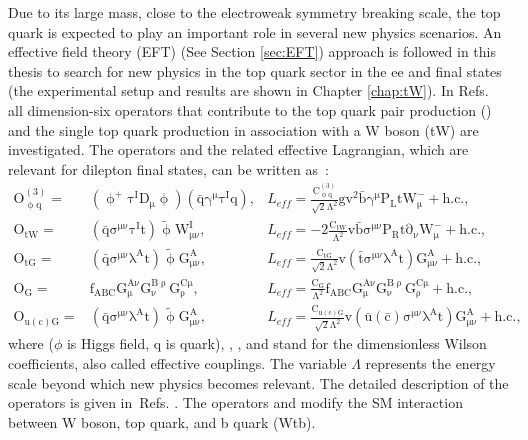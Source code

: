 Due to its large mass, close to the electroweak symmetry breaking scale, the top quark is expected to play an important role in several new physics scenarios.
An effective field theory (EFT) (See Section \ref{sec:EFT}) approach is followed in this thesis to search for new physics in the top quark sector in the ee and \mumu final states (the experimental setup and results are shown in Chapter \ref{chap:tW}).
In Refs.~\cite{Zhang:2010dr,Durieux:2014xla} all dimension-six operators that contribute to the top quark pair production (\ttbar) and the single top quark production in association with a W boson (tW) are investigated. The operators and the related effective Lagrangian, which are relevant for dilepton final states, can be written as~\cite{Grzadkowski:2010es}:
\begin{eqnarray}
\label{eq1}
\mathrm{O_{\upphi q}^{(3)}} =& \mathrm{(\upphi^+\tau^ID_\mu\upphi)(\bar{q}\gamma^\mu\tau^Iq)}  ,& L_\mathit{eff}=\mathrm{\frac{C_{\upphi q}^{(3)}}{{\sqrt 2}\Lambda^2} gv^2\bar{b}\gamma^\mu P_LtW^-_\mu+h.c.,}\\
\mathrm{O_{tW}} =& \mathrm{(\bar{q}\sigma^{\mu\nu}\tau^It)\tilde{\upphi}W^I_{\mu\nu}} ,& L_\mathit{eff}=\mathrm{-2\frac{C_{tW}}{\Lambda^2}v\bar{b}\sigma^{\mu\nu}P_Rt \partial_\nu W^-_\mu+h.c.,}\\
\mathrm{O_{tG}} =& \mathrm{(\bar{q}\sigma^{\mu\nu}\lambda^A t)\tilde{\upphi}G^A_{\mu\nu}} ,& L_\mathit{eff}= \mathrm{\frac{C_{tG}}{{\sqrt 2}\Lambda^2}v\left(\bar{t}\sigma^{\mu\nu}\lambda^A t\right) G_{\mu\nu}^A +h.c.,}\\
\mathrm{O_{G}} =& \mathrm{f_{ABC}G^{A\nu}_\mu G^{B\uprho}_\nu G^{C\mu}_\uprho} ,& L_\mathit{eff}= \mathrm{\frac{C_{G}}{\Lambda^2} f_{ABC}G^{A\nu}_\mu G^{B\uprho}_\nu G^{C\mu}_\uprho + h.c.,}\\
\mathrm{O_{u(c)G}} =&  \mathrm{(\bar{q}\sigma^{\mu\nu}\lambda^A t)\tilde{\upphi}G^A_{\mu\nu}}  ,& L_\mathit{eff}= \mathrm{\frac{C_{u(c)G}}{{\sqrt 2}\Lambda^2}v\left(\bar{u} \left(\bar{c}\right)\sigma^{\mu\nu}\lambda^A t\right) G_{\mu\nu}^A+h.c.,}
\end{eqnarray}
where \Cphiq ($\phi$ is Higgs field, q is quark), \CtW, \CtG, \CG and \CucG stand for the dimensionless Wilson coefficients, also called effective couplings.
The variable $\Lambda$ represents the energy scale beyond which new physics becomes relevant. The detailed description of the operators is given in~Refs. \cite{Zhang:2010dr,Durieux:2014xla}.
The operators \Ophiq and \OtW modify the SM interaction between W boson, top quark, and b quark (Wtb).
